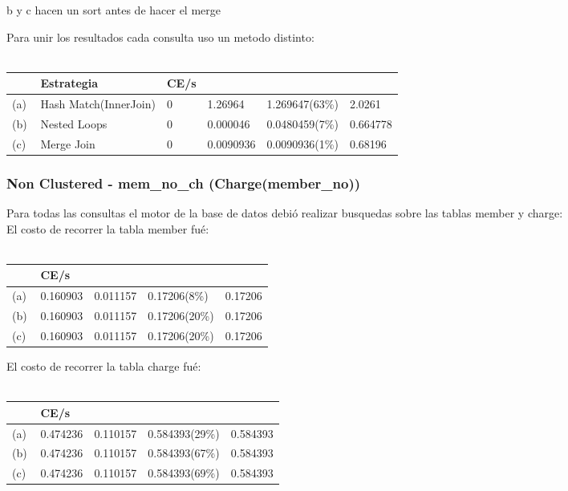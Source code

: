 b y c hacen un sort antes de hacer el merge


Para unir los resultados cada consulta uso un metodo distinto:\\ \\

\begin{tabular}{| L | L | L | L | L | L |}
    \hline
     & Estrategia & CE/s &  &  &  \\ \hline
    (a) & Hash Match(InnerJoin) & 0 & 1.26964 & 1.269647(63\%) & 2.0261 \\ \hline
    (b) & Nested Loops & 0 & 0.000046 & 0.0480459(7\%) & 0.664778 \\ \hline
    (c) & Merge Join & 0 & 0.0090936 & 0.0090936(1\%) & 0.68196 \\ \hline
\end{tabular}

	
	

\subsubsection{Non Clustered - mem\_no\_ch (Charge(member\_no))}
Para todas las consultas el motor de la base de datos debió realizar busquedas sobre las tablas member y charge: \\  

El costo de recorrer la tabla member fué: \\ \\

\begin{tabular}{| L | L | L | L | L |}
    \hline
     & CE/s &  &  &  \\ \hline
    (a) & 0.160903 & 0.011157 & 0.17206(8\%) & 0.17206 \\ \hline %
    (b) & 0.160903 & 0.011157 & 0.17206(20\%) & 0.17206 \\ \hline
    (c) & 0.160903 & 0.011157 & 0.17206(20\%) & 0.17206 \\ \hline
\end{tabular}

El costo de recorrer la tabla charge fué: \\ \\

\begin{tabular}{| L | L | L | L | L |}
    \hline
     & CE/s &  &  &  \\ \hline
    (a) & 0.474236 & 0.110157 & 0.584393(29\%) & 0.584393 \\ \hline
    (b) & 0.474236 & 0.110157 & 0.584393(67\%) & 0.584393 \\ \hline
    (c) & 0.474236 & 0.110157 & 0.584393(69\%) & 0.584393 \\ \hline
\end{tabular}

